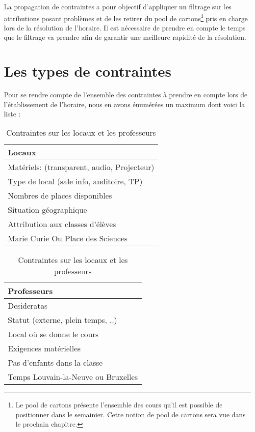 \newline
\indent
La propagation de contraintes a pour objectif d'appliquer un filtrage sur les attributions posant problèmes et de les retirer du pool de cartons\footnote{Le pool de cartons présente l'ensemble des cours qu'il est possible de positionner dans le semainier. Cette notion de pool de cartons sera vue dans le prochain chapitre.} pris en charge lors de la résolution de l'horaire. Il est nécessaire de prendre en compte le temps que le filtrage va prendre afin de garantir une meilleure rapidité de la résolution.

\section{Les types de contraintes}

Pour se rendre compte de l'ensemble des contraintes à prendre en compte lors de l'établissement de l'horaire, nous en avons énumérées un maximum dont voici la liste :\\

\begin{table}[h!]
\begin{minipage}[t]{.3\linewidth}
    \begin{tabular}{|l|}
    \hline
\textbf{Locaux}\\
\hline
\hline
Matériels: (transparent, audio, Projecteur)\\
\hline
Type de local (sale info, auditoire, TP)\\
\hline
Nombres de places disponibles\\
\hline
Situation géographique \\
\hline
Attribution aux classes d'élèves\\
\hline
Marie Curie Ou Place des Sciences\\
\hline   
    \end{tabular}
\end{minipage}
\hfill
\begin{minipage}[t]{.4\linewidth}
    \begin{tabular}{|l|}
    \hline
\textbf{Professeurs}\\
\hline
\hline
Desideratas\\
\hline
Statut (externe, plein temps, ..)\\
\hline
Local où se donne le cours\\
\hline
Exigences matérielles\\
\hline
Pas d'enfants dans la classe\\
\hline
Temps Louvain-la-Neuve ou Bruxelles\\
\hline
    \end{tabular}
\end{minipage}
\caption{Contraintes sur les locaux et les professeurs}
\label{locaux_prof}
\end{table}

